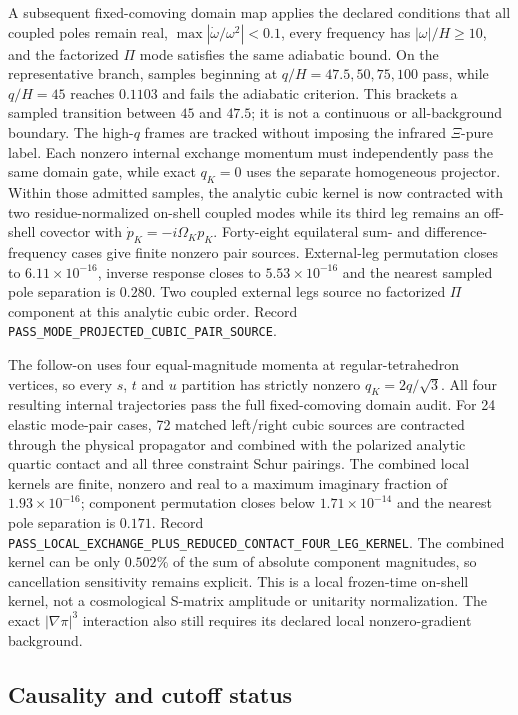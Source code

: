 A subsequent fixed-comoving domain map applies the declared conditions that
all coupled poles remain real, $\max|\dot\omega/\omega^2|<0.1$, every
frequency has $|\omega|/H\geq10$, and the factorized $\Pi$ mode satisfies the
same adiabatic bound.  On the representative branch, samples beginning at
$q/H=47.5,50,75,100$ pass, while $q/H=45$ reaches $0.1103$ and fails the
adiabatic criterion.  This brackets a sampled transition between $45$ and
$47.5$; it is not a continuous or all-background boundary.  The high-$q$
frames are tracked without imposing the infrared $\Xi$-pure label.  Each
nonzero internal exchange momentum must independently pass the same domain
gate, while exact $q_K=0$ uses the separate homogeneous projector.
Within those admitted samples, the analytic cubic kernel is now contracted
with two residue-normalized on-shell coupled modes while its third leg remains
an off-shell covector with $\dot p_K=-i\Omega_Kp_K$.  Forty-eight equilateral
sum- and difference-frequency cases give finite nonzero pair sources.
External-leg permutation closes to $6.11\times10^{-16}$, inverse response
closes to $5.53\times10^{-16}$ and the nearest sampled pole separation is
$0.280$.  Two coupled external legs source no factorized $\Pi$ component at
this analytic cubic order.  Record
\texttt{PASS\_MODE\_PROJECTED\_CUBIC\_PAIR\_SOURCE}.

The follow-on uses four equal-magnitude momenta at regular-tetrahedron
vertices, so every $s$, $t$ and $u$ partition has strictly nonzero
$q_K=2q/\sqrt3$.  All four resulting internal trajectories pass the full
fixed-comoving domain audit.  For 24 elastic mode-pair cases, 72 matched
left/right cubic sources are contracted through the physical propagator and
combined with the polarized analytic quartic contact and all three
constraint Schur pairings.  The combined local kernels are finite, nonzero
and real to a maximum imaginary fraction of $1.93\times10^{-16}$; component
permutation closes below $1.71\times10^{-14}$ and the nearest pole separation
is $0.171$.  Record
\texttt{PASS\_LOCAL\_EXCHANGE\_PLUS\_REDUCED\_CONTACT\_FOUR\_LEG\_KERNEL}.
The combined kernel can be only $0.502\%$ of the sum of absolute component
magnitudes, so cancellation sensitivity remains explicit.  This is a local
frozen-time on-shell kernel, not a cosmological S-matrix amplitude or
unitarity normalization.  The exact $|\nabla\pi|^3$ interaction also still
requires its declared local nonzero-gradient background.

\subsection{Causality and cutoff status}

